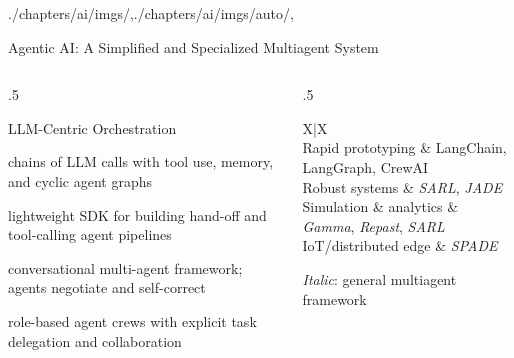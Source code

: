 \begin{graphicspathcontext}{{./chapters/ai/imgs/},{./chapters/ai/imgs/auto/},\old}
\begin{frame}[t]{{Agentic AI:} A Simplified and Specialized Multiagent System}
	\begin{columns}
		\begin{column}{.5\linewidth}
			\begin{block}{LLM-Centric Orchestration}
				\begin{compactdescription}
				\item[LangChain / LangGraph] chains of LLM calls with
				tool use, memory, and cyclic agent graphs
				\item[OpenAI Agents SDK] lightweight SDK for building
				hand-off and tool-calling agent pipelines
				\item[AutoGen (Microsoft)] conversational multi-agent
				framework; agents negotiate and self-correct
				\item[CrewAI] role-based agent crews with explicit
				task delegation and collaboration
				\end{compactdescription}
			\end{block}
    		\end{column}
		\begin{column}{.5\linewidth}
			\begin{stabularx}[title={Choosing the Right Tool}]{X|X}
			 \\
			Rapid prototyping & LangChain, LangGraph, CrewAI \\
			\hline
			Robust systems & \textit{SARL}, \textit{JADE} \\
			\hline
			Simulation \& analytics & \textit{Gamma}, \textit{Repast}, \textit{SARL} \\
			\hline
			IoT/distributed edge & \textit{SPADE}  \\
			\end{stabularx}
			{\smaller\smaller \textit{Italic}: general multiagent framework}
    		\end{column}
	\end{columns}
\end{frame}

\end{graphicspathcontext}

\endinput

